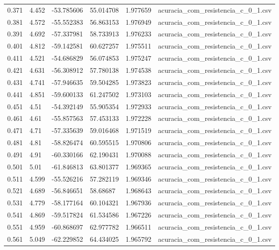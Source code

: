 \begin{table}
\begin{tabular}{llllll}
0.371 & 4.452 & -53.785606 & 55.014708 & 1.977659 & acuracia\_com\_resistencia\_c\_0\_1.csv \\
0.381 & 4.572 & -55.552383 & 56.863153 & 1.976949 & acuracia\_com\_resistencia\_c\_0\_1.csv \\
0.391 & 4.692 & -57.337981 & 58.733913 & 1.976233 & acuracia\_com\_resistencia\_c\_0\_1.csv \\
0.401 & 4.812 & -59.142581 & 60.627257 & 1.975511 & acuracia\_com\_resistencia\_c\_0\_1.csv \\
0.411 & 4.521 & -54.686829 & 56.074853 & 1.975247 & acuracia\_com\_resistencia\_c\_0\_1.csv \\
0.421 & 4.631 & -56.308912 & 57.780138 & 1.974538 & acuracia\_com\_resistencia\_c\_0\_1.csv \\
0.431 & 4.741 & -57.946635 & 59.504285 & 1.973823 & acuracia\_com\_resistencia\_c\_0\_1.csv \\
0.441 & 4.851 & -59.600133 & 61.247502 & 1.973103 & acuracia\_com\_resistencia\_c\_0\_1.csv \\
0.451 & 4.51 & -54.392149 & 55.905354 & 1.972933 & acuracia\_com\_resistencia\_c\_0\_1.csv \\
0.461 & 4.61 & -55.857563 & 57.453133 & 1.972228 & acuracia\_com\_resistencia\_c\_0\_1.csv \\
0.471 & 4.71 & -57.335639 & 59.016468 & 1.971519 & acuracia\_com\_resistencia\_c\_0\_1.csv \\
0.481 & 4.81 & -58.826474 & 60.595515 & 1.970806 & acuracia\_com\_resistencia\_c\_0\_1.csv \\
0.491 & 4.91 & -60.330166 & 62.190431 & 1.970088 & acuracia\_com\_resistencia\_c\_0\_1.csv \\
0.501 & 5.01 & -61.846813 & 63.801377 & 1.969365 & acuracia\_com\_resistencia\_c\_0\_1.csv \\
0.511 & 4.599 & -55.526216 & 57.282119 & 1.969346 & acuracia\_com\_resistencia\_c\_0\_1.csv \\
0.521 & 4.689 & -56.846651 & 58.68687 & 1.968643 & acuracia\_com\_resistencia\_c\_0\_1.csv \\
0.531 & 4.779 & -58.177164 & 60.104321 & 1.967936 & acuracia\_com\_resistencia\_c\_0\_1.csv \\
0.541 & 4.869 & -59.517824 & 61.534586 & 1.967226 & acuracia\_com\_resistencia\_c\_0\_1.csv \\
0.551 & 4.959 & -60.868697 & 62.977782 & 1.966511 & acuracia\_com\_resistencia\_c\_0\_1.csv \\
0.561 & 5.049 & -62.229852 & 64.434025 & 1.965792 & acuracia\_com\_resistencia\_c\_0\_1.csv \\

\end{tabular}
\end{table}
